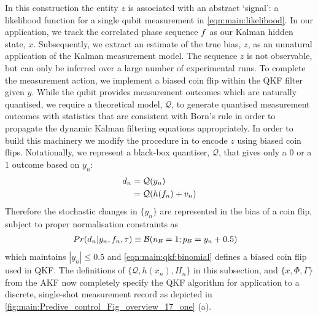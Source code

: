 In this construction the entity $z$ is associated with an abstract `signal': a likelihood function for a single qubit measurement in \cref{eqn:main:likelihood}.  In our application, we track the correlated phase sequence $f$ as our Kalman hidden state, $x$. Subsequently, we extract an estimate of the true bias, $z$, as an unnatural application of the Kalman measurement model.  The sequence $z$ is not observable, but can only be inferred over a large number of experimental runs. To complete the measurement action, we implement a biased coin flip within the QKF filter given $y$.  While the qubit provides measurement outcomes which are naturally quantised, we require a theoretical model, $\mathcal{Q}$, to generate quantised measurement outcomes with statistics that are consistent with Born's rule in order to propagate the dynamic Kalman filtering equations appropriately. In order to build this machinery we modify the procedure in \cite{karlsson2005} to encode $z$ using biased coin flips. Notationally, we represent a black-box quantiser, $\mathcal{Q}$, that gives only a $0$ or a $1$ outcome based on $y_n$:
\begin{align}
d_n &= \mathcal{Q}(y_n)\\
&=  \mathcal{Q}(h(f_n) + v_n)
\end{align}
Therefore the stochastic changes in $\{ y_n\}$ are represented in the bias of a coin flip, subject to proper normalisation constraints as  
\begin{align}
Pr(d_n| y_n, f_{n}, \tau) & \equiv \mathcal{B}(n_{\mathcal{B}}=1;p_{\mathcal{B}}= y_n + 0.5 ) \label{eqn:main:qkf:binomial}
\end{align}
which maintains $|y_n| \leq 0.5$ and \cref{eqn:main:qkf:binomial} defines a biased coin flip used in QKF.   The definitions of $\{ \mathcal{Q}, h(x_n), H_n \}$ in this subsection, and $\{x, \Phi, \Gamma\}$ from the AKF now completely specify the QKF algorithm for application to a discrete, single-shot measurement record as depicted in \cref{fig:main:Predive_control_Fig_overview_17_one} (a).  



